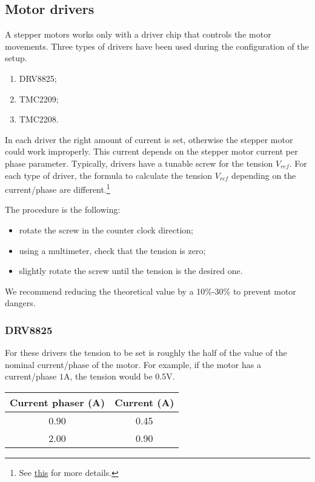 \subsection{Motor drivers}
A stepper motors works only with a driver chip that controls the motor movements.
Three types of drivers have been used during the configuration of the setup.
\begin{enumerate}
    \item DRV8825;
    \item TMC2209;
    \item TMC2208.
\end{enumerate}

In each driver the right amount of current is set, otherwise the stepper motor could work improperly.
This current depends on the stepper motor current per phase parameter.
Typically, drivers have a tunable screw for the tension \(V_{ref}\).
For each type of driver, the formula to calculate the tension \(V_{ref}\) depending on the current/phase are different.\footnote{See \href{https://all3dp.com/2/vref-calculator-tmc2209-tmc2208-a4988/}{this} for more details.}

The procedure is the following:
\begin{itemize}
    \item rotate the screw in the counter clock direction;
    \item using a multimeter, check that the tension is zero;
    \item slightly rotate the screw until the tension is the desired one.
\end{itemize}
We recommend reducing the theoretical value by a 10\%-30\% to prevent motor dangers.

\subsubsection{DRV8825}
For these drivers the tension to be set is roughly the half of the value of the nominal current/phase of the motor.
For example, if the motor has a current/phase \(1\)A, the tension would be \(0.5\)V.

\begin{minipage}
    {.4\textwidth}
    \begin{tabular}{cc}
        Current phaser (A) & Current (A) \\
        \hline
        0.90 & 0.45 \\
        2.00 & 0.90             
    \end{tabular}
    \label{tab:drivers_curr}
\end{minipage} 

